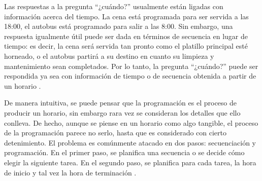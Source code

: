 \documentclass[draft,12pt,headsepline,footsepline,paper=letter]{scrreprt}
\begin{document}
Las respuestas a la pregunta “¿cuándo?” usualmente están ligadas con información acerca del tiempo. La cena está programada para ser servida a las 18:00, el autobus está programado para salir a las 8:00. Sin embargo, una respuesta igualmente útil puede ser dada en términos de secuencia en lugar de tiempo: es decir, la cena será servida tan pronto como el platillo principal esté horneado, o el autobus partirá a su destino en cuanto su limpieza y mantenimiento sean completados. Por lo tanto, la pregunta “¿cuándo?” puede ser respondida ya sea con información de tiempo o de secuencia obtenida a partir de un horario \citep[p.~1]{Baker2009}.

De manera intuitiva, se puede pensar que la programación es el proceso de producir un horario, sin embargo rara vez se consideran los detalles que ello conlleva. De hecho, aunque se piense en un horario como algo tangible, el proceso de la programación parece no serlo, hasta que es considerado con cierto detenimiento. El problema es comúnmente atacado en dos pasos: secuenciación y programación. En el primer paso, se planifica una secuencia o se decide cómo elegir la siguiente tarea. En el segundo paso, se planifica para cada tarea, la hora de inicio y tal vez la hora de terminación \citep[p.~2]{Baker2009}. 
\end{document}
